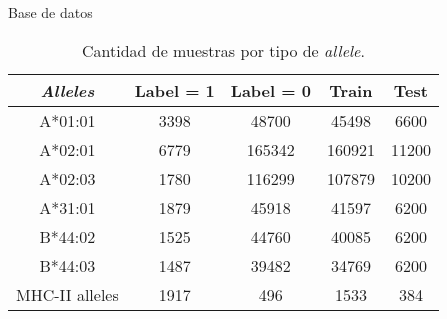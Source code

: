 \documentclass[10pt]{beamer}
\newcommand{\1}{
	\setbeamertemplate{background}{
		\texttt{[image: img/1]}
		\tikz[overlay] \fill[fill opacity=0.75,fill=white] (0,0) rectangle (-\paperwidth,\paperheight);
	}
}
\begin{document}
\begin{frame}{Base de datos}{}
	\begin{table}[h]
		\centering
		\caption{Cantidad de muestras por tipo de \textit{allele}.}
		\label{tab:db}
		\setlength{\tabcolsep}{0.8em} %
		{\renewcommand{\arraystretch}{1.3}%
			\begin{tabular}{ccccc}
				\hline
				\textit{\textbf{Alleles}} & \textbf{Label = 1} & \textbf{Label = 0} & \textbf{Train}  & \textbf{Test}  \\ \hline
				A*01:01                   & 3398               & 48700              & 45498  & 6600  \\ 
				A*02:01                   & 6779               & 165342             & 160921 & 11200 \\ 
				A*02:03                   & 1780               & 116299             & 107879 & 10200 \\ 
				A*31:01                   & 1879               & 45918              & 41597  & 6200  \\ 
				B*44:02                   & 1525               & 44760              & 40085  & 6200  \\ 
				B*44:03                   & 1487               & 39482              & 34769  & 6200  \\ 
				MHC-II alleles            & 1917               & 496                & 1533  & 384  \\ 
			\end{tabular}
		}
	\end{table}
\end{frame}
\end{document}

